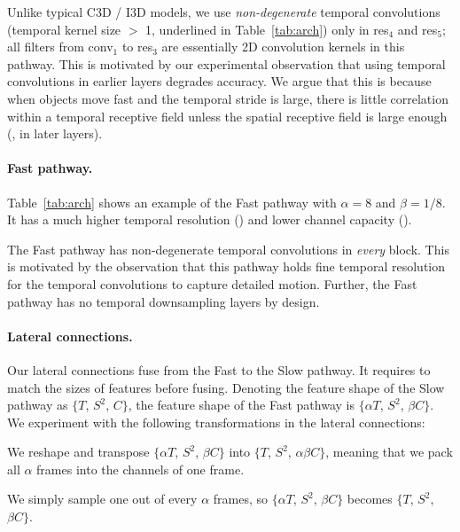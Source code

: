 \documentclass[10pt,twocolumn,letterpaper]{article}
\renewcommand{\omega}{\alpha}
\renewcommand{\phi}{\beta}
\begin{document}
	Unlike typical C3D / I3D models, we use \emph{non-degenerate} temporal convolutions (temporal kernel size $>$ 1, underlined in Table~\ref{tab:arch}) only in res$_4$ and res$_5$; all filters from conv$_1$ to res$_3$ are essentially 2D convolution kernels in this pathway. This is motivated by our experimental observation that using temporal convolutions in earlier layers degrades accuracy. We argue that this is because when objects move fast and the temporal stride is large, there is little correlation within a temporal receptive field unless the spatial receptive field is large enough (\ie, in later layers).
	
	\paragraph{Fast pathway.}
	Table~\ref{tab:arch} shows an example of the Fast pathway with $\omega=8$ and $\phi=1/8$. It has a much higher temporal resolution () and lower channel capacity ().
	
	The Fast pathway has non-degenerate temporal convolutions in \emph{every} block. This is motivated by the observation that this pathway holds fine temporal resolution for the temporal convolutions to capture detailed motion. Further, the Fast pathway has no temporal downsampling layers by design.
	
	\paragraph{Lateral connections.} Our lateral connections fuse from the Fast to the Slow pathway.
	It requires to match the sizes of features before fusing.
	Denoting the feature shape of the Slow pathway as $\{$$T$, $S^2$, $C$$\}$, the feature shape of the Fast pathway is $\{$$\omega T$, $S^2$, $\phi C$$\}$.
	We experiment with the following transformations in the lateral connections:
	
	\vspace{.5em}
	 We reshape and transpose $\{$$\omega T$, $S^2$, $\phi C$$\}$ into $\{$$T$, $S^2$, $\omega\phi C$$\}$, meaning that we pack all $\omega$ frames into the channels of one frame.
	
	\vspace{.5em}
	 We simply sample one out of every $\omega$ frames, so $\{$$\omega T$, $S^2$, $\phi C$$\}$ becomes $\{$$T$, $S^2$, $\phi C$$\}$.
	
\end{document}
